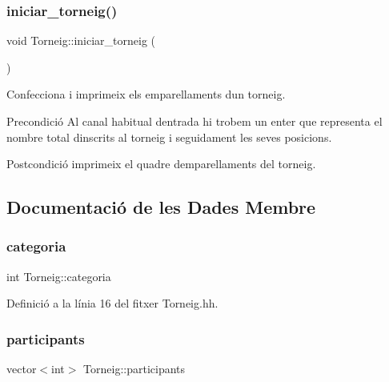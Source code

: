 \subsubsection{\texorpdfstring{iniciar\+\_\+torneig()}{iniciar\_torneig()}}
{\footnotesize\ttfamily void Torneig\+::iniciar\+\_\+torneig (\begin{DoxyParamCaption}{ }\end{DoxyParamCaption})}



Confecciona i imprimeix els emparellaments d\textquotesingle{}un torneig. 

\begin{DoxyPrecond}{Precondició}
Al canal habitual d\textquotesingle{}entrada hi trobem un enter que representa el nombre total d\textquotesingle{}inscrits al torneig i seguidament les seves posicions. 
\end{DoxyPrecond}
\begin{DoxyPostcond}{Postcondició}
imprimeix el quadre d\textquotesingle{}emparellaments del torneig. 
\end{DoxyPostcond}


\subsection{Documentació de les Dades Membre}
\mbox{\label{class_torneig_a8a80ab41ebab7d88a2569247c6ec4c81}} 
\subsubsection{\texorpdfstring{categoria}{categoria}}
{\footnotesize\ttfamily int Torneig\+::categoria\hspace{0.3cm}{\ttfamily [private]}}



Definició a la línia 16 del fitxer Torneig.\+hh.

\mbox{\label{class_torneig_a7146b542f678d15c1847f9ec57c866bf}} 
\subsubsection{\texorpdfstring{participants}{participants}}
{\footnotesize\ttfamily vector$<$int$>$ Torneig\+::participants\hspace{0.3cm}{\ttfamily [private]}}



